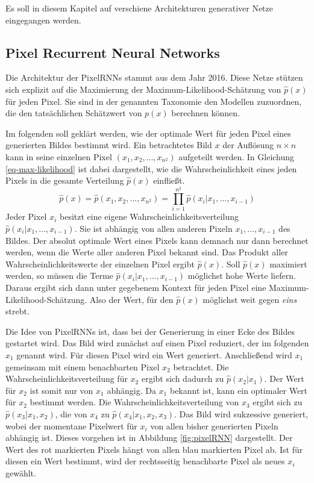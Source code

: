 
Es soll in diesem Kapitel auf verschiene Architekturen generativer Netze eingegangen werden.

\subsection{Pixel Recurrent Neural Networks}
Die Architektur der \acp{PixelRNN} stammt aus dem Jahr 2016. Diese Netze stützen sich explizit auf die Maximierung der Maximum-Likelihood-Schätzung von $\hat{p}(x)$ für jeden Pixel. Sie sind in der genannten Taxonomie den Modellen zuzuordnen, die den tatsächlichen Schätzwert von $p(x)$ berechnen können. \cite{pixelRNN}

Im folgenden soll geklärt werden, wie der optimale Wert für jeden Pixel eines generierten Bildes bestimmt wird. Ein betrachtetes Bild $x$ der Auflösung $n \times n$ kann in seine einzelnen Pixel $(x_{1}, x_{2}, ..., x_{n^2})$ aufgeteilt werden. In Gleichung \ref{eq-max-likelihood} ist dabei dargestellt, wie die Wahrscheinlichkeit eines jeden Pixels in die gesamte Verteilung $\hat{p}(x)$ einfließt. \cite{pixelRNN}
\begin{equation}
   \label{eq-max-likelihood}
   \hat{p}(x) = \hat{p}(x_{1}, x_{2}, ..., x_{n^2}) = \prod_{i=1}^{n^2}\hat{p}(x_{i}|x_{1},...,x_{i-1})
\end{equation}
Jeder Pixel $x_{i}$ besitzt eine eigene Wahrscheinlichkeitsverteilung $\hat{p}(x_{i}|x_{1},...,x_{i-1})$. Sie ist abhängig von allen anderen Pixeln $x_{1},...,x_{i-1}$ des Bildes. Der absolut optimale Wert eines Pixels kann demnach nur dann berechnet werden, wenn die Werte aller anderen Pixel bekannt sind. Das Produkt aller Wahrscheinlichkeitswerte der einzelnen Pixel ergibt $\hat{p}(x)$. Soll $\hat{p}(x)$ maximiert werden, so müssen die Terme $\hat{p}(x_{i}|x_{1},...,x_{i-1})$ möglichst hohe Werte liefern. Daraus ergibt sich dann unter gegebenem Kontext für jeden Pixel eine Maximum-Likelihood-Schätzung. Also der Wert, für den $\hat{p}(x)$ möglichst weit gegen \emph{eins} strebt. \cite{pixelRNN}

Die Idee von PixelRNNs ist, dass bei der Generierung in einer Ecke des Bildes gestartet wird. Das Bild wird zunächst auf einen Pixel reduziert, der im folgenden $x_{1}$ genannt wird. Für diesen Pixel wird ein Wert generiert. Anschließend wird $x_{1}$ gemeinsam mit einem benachbarten Pixel $x_{2}$ betrachtet. Die Wahrscheinlichkeitsverteilung für $x_{2}$ ergibt sich dadurch zu $\hat{p}(x_{2}|x_{1})$. Der Wert für $x_2$ ist somit nur von $x_1$ abhängig. Da $x_{1}$ bekannt ist, kann ein optimaler Wert für $x_{2}$ bestimmt werden. Die Wahrscheinlichkeitsverteilung von $x_{3}$ ergibt sich zu $\hat{p}(x_{3}|x_{1}, x_{2})$, die von $x_{4}$ zu $\hat{p}(x_{4}|x_{1}, x_{2}, x_{3})$. Das Bild wird sukzessive generiert, wobei der momentane Pixelwert für $x_{i}$ von allen bisher generierten Pixeln abhängig ist. Dieses vorgehen ist in Abbildung \ref{fig:pixelRNN} dargestellt. Der Wert des rot markierten Pixels hängt von allen blau markierten Pixel ab. Ist für diesen ein Wert bestimmt, wird der rechtsseitig benachbarte Pixel als neues $x_{i}$ gewählt.

